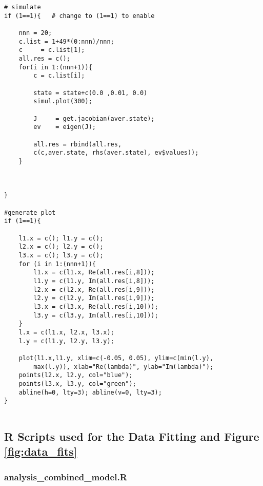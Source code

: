 \begin{lstlisting}
# simulate 	
if (1==1){   # change to (1==1) to enable
	
	nnn = 20;
	c.list = 1+49*(0:nnn)/nnn;
	c     = c.list[1];
	all.res = c();
	for(i in 1:(nnn+1)){
		c = c.list[i];
		
		state = state+c(0.0 ,0.01, 0.0)
		simul.plot(300); 
			
		J     = get.jacobian(aver.state);
		ev    = eigen(J);
		
		all.res = rbind(all.res, 
		c(c,aver.state, rhs(aver.state), ev$values));
	}
		
	
		
}
	
#generate plot	
if (1==1){
	
	l1.x = c(); l1.y = c();
	l2.x = c(); l2.y = c();
	l3.x = c(); l3.y = c();
	for (i in 1:(nnn+1)){
		l1.x = c(l1.x, Re(all.res[i,8]));  
		l1.y = c(l1.y, Im(all.res[i,8]));
		l2.x = c(l2.x, Re(all.res[i,9]));  
		l2.y = c(l2.y, Im(all.res[i,9]));
		l3.x = c(l3.x, Re(all.res[i,10])); 
		l3.y = c(l3.y, Im(all.res[i,10]));
	}
	l.x = c(l1.x, l2.x, l3.x);
	l.y = c(l1.y, l2.y, l3.y);
		
	plot(l1.x,l1.y, xlim=c(-0.05, 0.05), ylim=c(min(l.y), 
		max(l.y)), xlab="Re(lambda)", ylab="Im(lambda)");
	points(l2.x, l2.y, col="blue");
	points(l3.x, l3.y, col="green");
	abline(h=0, lty=3); abline(v=0, lty=3);
}
	
\end{lstlisting}

\newpage

\subsection{R Scripts used for the Data Fitting and Figure \ref{fig:data_fits}}

\subsubsection{analysis\_combined\_model.R}

